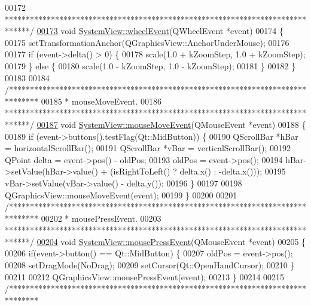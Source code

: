 \begin{DoxyCode}
00172 \textcolor{comment}{ ******************************************************************************/}
\hypertarget{systemview_8cpp_source_l00173}{}\hyperlink{group___graphics_gaab2fa6cebf9022eb6bf31497c0789675}{00173} \textcolor{keywordtype}{void} \hyperlink{group___graphics_gaab2fa6cebf9022eb6bf31497c0789675}{SystemView::wheelEvent}(QWheelEvent *event)
00174 \{
00175   setTransformationAnchor(QGraphicsView::AnchorUnderMouse);
00176 
00177   \textcolor{keywordflow}{if} (event->delta() > 0) \{
00178     scale(1.0 + kZoomStep, 1.0 + kZoomStep);
00179   \} \textcolor{keywordflow}{else} \{
00180     scale(1.0 - kZoomStep, 1.0 - kZoomStep);
00181   \}
00182 \}
00183 
00184 \textcolor{comment}{/*******************************************************************************}
00185 \textcolor{comment}{ * mouseMoveEvent.}
00186 \textcolor{comment}{ ******************************************************************************/}
\hypertarget{systemview_8cpp_source_l00187}{}\hyperlink{group___graphics_gab19e233cd697852dd71140971cb6e122}{00187} \textcolor{keywordtype}{void} \hyperlink{group___graphics_gab19e233cd697852dd71140971cb6e122}{SystemView::mouseMoveEvent}(QMouseEvent *event)
00188 \{
00189   \textcolor{keywordflow}{if} (event->buttons().testFlag(Qt::MidButton)) \{
00190     QScrollBar *hBar = horizontalScrollBar();
00191     QScrollBar *vBar = verticalScrollBar();
00192     QPoint delta = \textcolor{keyword}{event}->pos() - oldPos;
00193     oldPos = \textcolor{keyword}{event}->pos();
00194     hBar->setValue(hBar->value() + (isRightToLeft() ? delta.x() : -delta.x()));
00195     vBar->setValue(vBar->value() - delta.y());
00196   \}
00197 
00198   QGraphicsView::mouseMoveEvent(event);
00199 \}
00200 
00201 \textcolor{comment}{/*******************************************************************************}
00202 \textcolor{comment}{ * mousePressEvent.}
00203 \textcolor{comment}{ ******************************************************************************/}
\hypertarget{systemview_8cpp_source_l00204}{}\hyperlink{group___graphics_ga42d4a485d6d9bd891d9505a5213cf783}{00204} \textcolor{keywordtype}{void} \hyperlink{group___graphics_ga42d4a485d6d9bd891d9505a5213cf783}{SystemView::mousePressEvent}(QMouseEvent *event)
00205 \{
00206   \textcolor{keywordflow}{if}(event->button() == Qt::MidButton) \{
00207     oldPos = \textcolor{keyword}{event}->pos();
00208     setDragMode(NoDrag);
00209     setCursor(Qt::OpenHandCursor);
00210   \}
00211 
00212   QGraphicsView::mousePressEvent(event);
00213 \}
00214 
00215 \textcolor{comment}{/*******************************************************************************}

\end{DoxyCode}

